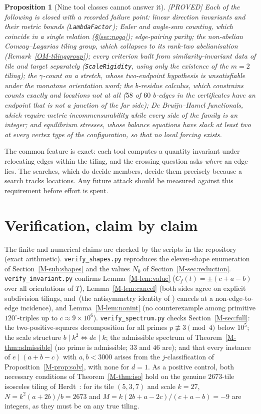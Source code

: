 \documentclass[11pt,reqno]{amsart}
\theoremstyle{plain}
\newtheorem{proposition}[theorem]{Proposition}
\theoremstyle{definition}
\newcommand{\lab}[1]{\hfill\textnormal{\footnotesize\textsc{[#1]}}}
\begin{document}
\begin{proposition}[Nine tool classes cannot answer it]\label{prop:ninetools}\lab{PROVED}
Each of the following is closed with a recorded failure point: linear direction invariants and their
metric bounds (\texttt{LambdaFactor}); Euler and angle-sum counting, which coincide in a single
relation (\S\ref{sec:nogo}); edge-pairing parity; the non-abelian Conway--Lagarias tiling group,
which collapses to its rank-two abelianisation (Remark~\ref{OM-tilinggroup}); every criterion built
from similarity-invariant data of tile and target separately (\texttt{ScaleRigidity}, using only the
existence of the $m=2$ tiling); the $\gamma$-count on a stretch, whose two-endpoint hypothesis is
unsatisfiable under the monotone orientation word; the $b$-residue calculus, which constrains counts
exactly and locations not at all ($58$ of $60$ $b$-edges in the certificates have an endpoint that
is not a junction of the far side); De Bruijn--Hamel functionals, which require metric
incommensurability while every side of the family is an integer; and equilibrium stresses, whose
balance equations have slack at least two at every vertex type of the configuration, so that no
local forcing exists.
\end{proposition}

The common feature is exact: each tool computes a quantity invariant under relocating edges within
the tiling, and the crossing question asks \emph{where} an edge lies. The searches, which do decide
members, decide them precisely because a search tracks locations. Any future attack should be
measured against this requirement before effort is spent.

\section{Verification, claim by claim}\label{sec:verif}

The finite and numerical claims are checked by the scripts in the repository (exact arithmetic).
\texttt{verify\_shapes.py} reproduces the eleven-shape enumeration of Section~\ref{M-sub:shapes} and
the values $N_0$ of Section~\ref{M-sec:reduction}. \texttt{verify\_invariant.py} confirms
Lemma~\ref{M-lem:value} ($C_f(t)=\pm(c+a-b)$ over all orientations of $T$), Lemma~\ref{M-lem:cancel}
(both sides agree on explicit subdivision tilings, and~(the antisymmetry identity of \cite{Main}) cancels at a
non-edge-to-edge incidence), and Lemma~\ref{M-lem:nonint} (no counterexample among primitive
$120^\circ$-triples up to $c\approx 9\times10^6$). \texttt{verify\_spectrum.py} checks
Section~\ref{M-sec:full}: the two-positive-squares decomposition for all primes
$p\not\equiv3\pmod4$ below $10^5$; the scale structure $b\mid k^2\iff de\mid k$; the admissible
spectrum of Theorem~\ref{M-thm:admissible} (no prime is admissible; $33$ and $46$ are); and that
every instance of $e\mid(a+b-c)$ with $a,b<3000$ arises from the $j$-classification of
Proposition~\ref{M-prop:solv}, with none for $d=1$. As a positive control, both necessary conditions
of Theorem~\ref{M-thm:iso} hold on the genuine $2673$-tile isosceles tiling of
Herdt~\cite{BeesonIso}: for its tile $(5,3,7)$ and scale $k=27$, $N=k^2(a+2b)/b=2673$ and
$M=k(2b+a-2c)/(c+a-b)=-9$ are integers, as they must be on any true tiling.
\end{document}
